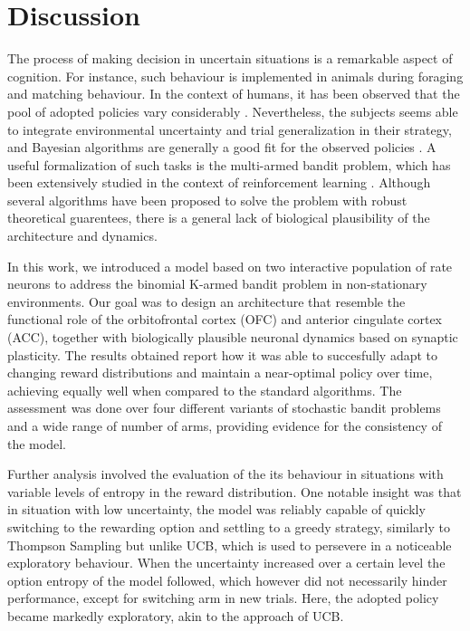 
\section{Discussion}

The process of making decision in uncertain situations is a remarkable aspect of cognition. For instance, such behaviour is implemented in animals during foraging and matching behaviour.
In the context of humans, it has been observed that the pool of adopted policies vary considerably \cite{steyversBayesianAnalysisHuman2009a}.
Nevertheless, the subjects seems able to integrate environmental uncertainty and trial generalization in their strategy, and Bayesian algorithms are generally a good fit for the observed policies \cite{schulzFindingStructureMultiarmed2020, zhangForgetfulBayesMyopic2013}.
A useful formalization of such tasks is the multi-armed bandit problem, which has been extensively studied in the context of reinforcement learning \cite{suttonReinforcementLearningProblem1998}.
Although several algorithms have been proposed to solve the problem with robust theoretical guarentees, there is a general lack of biological plausibility of the architecture and dynamics.

%
In this work, we introduced a model based on two interactive population of rate neurons to address the binomial K-armed bandit problem in non-stationary environments.
Our goal was to design an architecture that resemble the functional role of the orbitofrontal cortex (OFC) and anterior cingulate cortex (ACC), together with biologically plausible neuronal dynamics based on synaptic plasticity.
The results obtained report how it was able to succesfully adapt to changing reward distributions and maintain a near-optimal policy over time, achieving equally well when compared to the standard algorithms.
The assessment was done over four different variants of stochastic bandit problems and a wide range of number of arms, providing evidence for the consistency of the model.

Further analysis involved the evaluation of the its behaviour in situations with variable levels of entropy in the reward distribution.
One notable insight was that in situation with low uncertainty, the model was reliably capable of quickly switching to the rewarding option and settling to a greedy strategy, similarly to Thompson Sampling but unlike UCB, which is used to persevere in a noticeable exploratory behaviour.
When the uncertainty increased over a certain level the option entropy of the model followed, which however did not necessarily hinder performance, except for switching arm in new trials.
Here, the adopted policy became markedly exploratory, akin to the approach of UCB.

